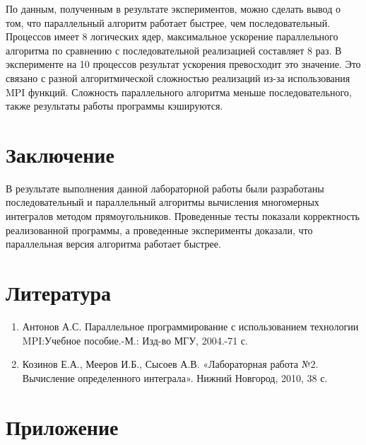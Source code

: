 \documentclass{report}
\begin{document}
\par По данным, полученным в результате экспериментов, можно сделать вывод о том, что параллельный алгоритм работает  быстрее, чем последовательный. Процессов имеет 8 логических ядер, максимальное ускорение параллельного алгоритма  по сравнению с последовательной реализацией составляет 8 раз. В эксперименте на 10 процессов результат ускорения превосходит это значение. Это связано с разной алгоритмической сложностью реализаций из-за использования MPI функций. Сложность параллельного алгоритма меньше последовательного, также результаты работы программы кэшируются.
\newpage


\section*{Заключение}
В результате выполнения   данной лабораторной работы были разработаны последовательный и параллельный алгоритмы вычисления многомерных интегралов методом прямоугольников. Проведенные тесты показали корректность реализованной программы, а проведенные эксперименты доказали, что параллельная версия алгоритма работает быстрее.
\newpage

\section*{Литература}
\begin{enumerate}
\item Антонов А.С. Параллельное программирование с использованием технологии MPI:Учебное пособие.-М.: Изд-во МГУ, 2004.-71 с.
\item Козинов Е.А., Мееров И.Б., Сысоев А.В. «Лабораторная работа №2. Вычисление определенного интеграла». Нижний Новгород, 2010, 38 с.


\end{enumerate} 
\newpage

\section*{Приложение}
\end{document}
